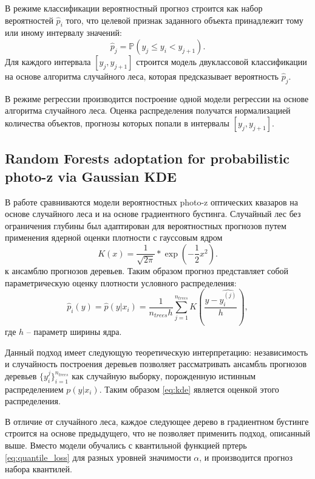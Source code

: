 \documentclass[fleqn,usenatbib]{mnras}
\begin{document}
В режиме классификации вероятностный прогноз строится как набор вероятностей $\hat{p}_i$ того, что целевой признак заданного объекта принадлежит тому или иному интервалу значений:
\begin{equation}
    \hat{p}_j = \mathbb{P}(y_j \leq y_i < y_{j+1}).
\end{equation}
Для каждого интервала $[y_j, y_{j+1}]$ строится модель двуклассовой классификации на основе алгоритма случайного леса, которая предсказывает вероятность $\hat{p}_j$.

В режиме регрессии производится построение одной модели регрессии на основе алгоритма случайного леса. Оценка распределения получатся нормализацией количества объектов, прогнозы которых попали в интервалы $[y_j, y_{j+1}]$.

\subsection{Random Forests adoptation for probabilistic photo-z via Gaussian KDE}
В работе \cite{bib:mesch} сравниваются модели вероятностных photo-z оптических квазаров на основе случайного леса и на основе градиентного бустинга. Случайный лес без ограничения глубины был адаптирован для вероятностных прогнозов путем применения ядерной оценки плотности с гауссовым ядром
\begin{equation}\label{eq:gaussian_kernel}
    K(x) = \frac{1}{\sqrt{2\pi}} * \exp{(-\frac{1}{2} x^2)}.
\end{equation}
к ансамблю прогнозов деревьев. Таким образом прогноз представляет собой параметрическую оценку плотности условного распределения:
\begin{equation}\label{eq:kde}
    \hat{p}_i (y) = \hat{p}(y|x_i) = \frac{1}{n_{trees} h}\sum_{j=1}^{n_{trees}} K(\frac{y - \hat{y^{(j)}_i}}{h}),
\end{equation}
где $h$ -- параметр ширины ядра.

Данный подход имеет следующую теоретическую интерпретацию: независимость и случайность построения деревьев позволяет рассматривать ансамбль прогнозов деревьев $\{y^j_i\}_{i=1}^{n_{trees}}$ как случайную выборку, порожденную истинным распределением $p(y|x_i)$. Таким образом \eqref{eq:kde} является оценкой этого распределения.

В отличие от случайного леса, каждое следующее дерево в градиентном бустинге строится на основе предыдущего, что не позволяет применить подход, описанный выше. Вместо модели обучались с квантильной функцией пртерь \eqref{eq:quantile_loss} для разных уровней значимости $\alpha$, и производится прогноз набора квантилей.
\end{document}
